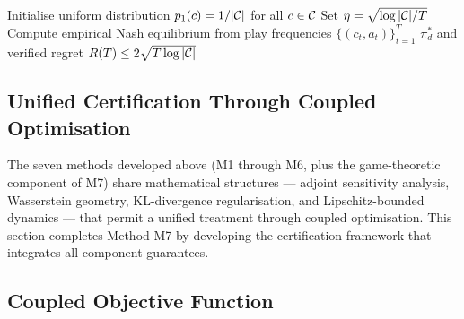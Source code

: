 \begin{algorithm}[htbp]
\caption{Game-Theoretic Robustness with Uncertainty-Guided Online Learning}\label{alg:game}
Initialise uniform distribution $p_1(c) = 1/|\mathcal{C}|$ for all $c\in\mathcal{C}$\;
Set $\eta = \sqrt{\log|\mathcal{C}|/T}$\;
Compute empirical Nash equilibrium from play frequencies $\{(c_t,a_t)\}_{t=1}^T$\;
\Return $\pi_d^*$ and verified regret $R(T)\le 2\sqrt{T\log|\mathcal{C}|}$
\end{algorithm}


\subsection{Unified Certification Through Coupled Optimisation}
\label{sec:unified}

The seven methods developed above (M1 through M6, plus the game-theoretic component of M7) share mathematical structures — adjoint sensitivity analysis, Wasserstein geometry, KL-divergence regularisation, and Lipschitz-bounded dynamics — that permit a unified treatment through coupled optimisation. This section completes Method M7 by developing the certification framework that integrates all component guarantees.

\subsection{Coupled Objective Function}


